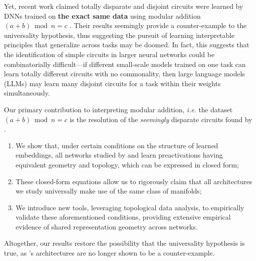 \documentclass{article} %
\theoremstyle{plain}
\theoremstyle{definition}
\newtheorem{empirical fact}[theorem]{Empirical Fact}
\begin{document}
Yet, recent work claimed totally disparate and disjoint circuits were learned by DNNs trained on \textbf{the exact same data} using modular addition $(a+b)\bmod n = c$ \citep{zhong2023the}. Their results seemingly provide a counter-example to the universality hypothesis, thus suggesting the pursuit of learning interpretable principles that generalize across tasks may be doomed. In fact, this suggests that the identification of simple circuits in larger neural networks could be combinatorially difficult---if different small-scale models trained on one task can learn totally different circuits with no commonality, then large language models (LLMs) may learn many disjoint circuits for a task within their weights simultaneously. 

Our primary contribution to interpreting modular addition, \textit{i.e.} the dataset $(a+b)\bmod n = c$ is the resolution of the \textit{seemingly} disparate circuits found by \cite{zhong2023the}.

\begin{enumerate}
    \item We show that, under certain conditions on the structure of learned embeddings, all networks studied by \citet{zhong2023the} and \citet{mccracken2025uncoveringuniversalabstractalgorithm} learn preactivations having equivalent geometry and topology, which can be expressed in closed form;
    \item These closed-form equations allow us to rigorously claim that all architectures we study universally make use of the same class of manifolds;
    \item We introduce new tools, leveraging topological data analysis, to empirically validate these aforementioned conditions, providing extensive empirical evidence of shared representation geometry across networks.
\end{enumerate}


Altogether, our results restore the possibility that the universality hypothesis is true, as \cite{zhong2023the}'s architectures are no longer shown to be a counter-example. 
\end{document}
